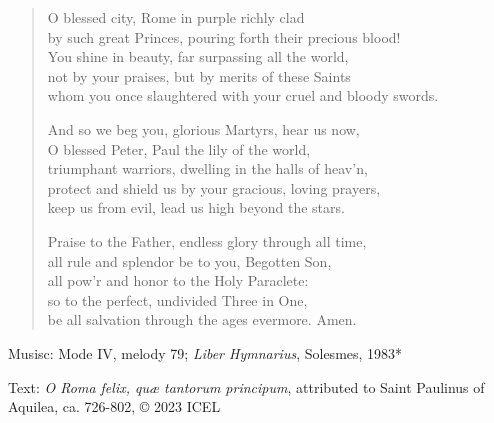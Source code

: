 \hymn

\begin{verse}
O blessed city, Rome in purple richly clad\\
by such great Princes, pouring forth their precious blood!\\
You shine in beauty, far surpassing all the world,\\
not by your praises, but by merits of these Saints\\
whom you once slaughtered with your cruel and bloody swords.

And so we beg you, glorious Martyrs, hear us now,\\
O blessed Peter, Paul the lily of the world,\\
triumphant warriors, dwelling in the halls of heav’n,\\
protect and shield us by your gracious, loving prayers,\\
keep us from evil, lead us high beyond the stars.

Praise to the Father, endless glory through all time,\\
all rule and splendor be to you, Begotten Son,\\
all pow’r and honor to the Holy Paraclete:\\
so to the perfect, undivided Three in One,\\
be all salvation through the ages evermore. Amen.
\end{verse}

\begin{hymnsource}
Musisc: Mode IV, melody 79; \emph{Liber Hymnarius}, Solesmes, 1983*

Text: \emph{O Roma felix, quæ tantorum principum}, attributed to Saint Paulinus of Aquilea, ca. 726-802, © 2023 ICEL
\end{hymnsource}

